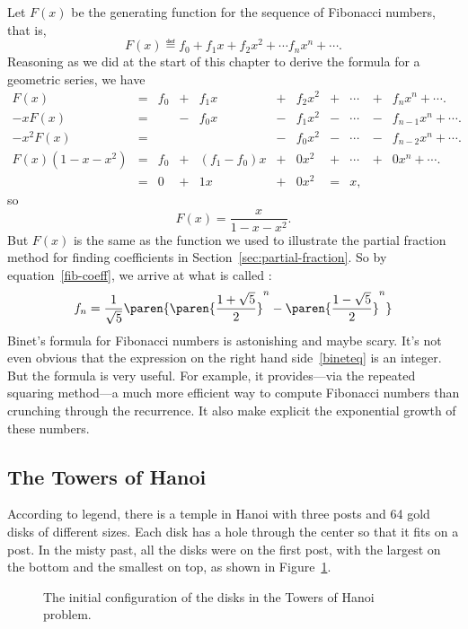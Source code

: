 Let $F(x)$ be the generating function for the sequence of
Fibonacci numbers, that is,
\[
F(x) \eqdef f_0 + f_1 x + f_2 x^2 + \cdots f_n x^n + \cdots.
\]
Reasoning as we did at the start of this chapter to derive the formula
for a geometric series, we have
\[
\begin{array}{rcrcrcrcrcrcr}
F(x)     & = & f_0 & + & f_1 x & + & f_2 x^2 & + & \cdots & + &    f_n x^n + \cdots.\\
-xF(x)   & = &     & - & f_0 x & - & f_1 x^2 & - & \cdots & - & f_{n-1} x^n + \cdots.\\
-x^2F(x) & = &     &   &       & - & f_0 x^2 & - & \cdots & - & f_{n-2} x^n + \cdots.\\
\hline
F(x)(1-x-x^2)
         & = & f_0 & + & (f_1-f_0) x
                               & + &   0 x^2 & + & \cdots & + & 0 x^n + \cdots.\\
         & = &  0  & + & 1   x & + &   0 x^2 & = & x,
\end{array}
\]
so
\[
F(x) = \frac{x}{1 - x - x^2}.
\]
But $F(x)$ is the same as the function we used to illustrate the
partial fraction method for finding coefficients in
Section~\ref{sec:partial-fraction}.  So by equation~\eqref{fib-coeff},
we arrive at what is called :
\begin{equation}\label{bineteq}
 f_n  = \frac{1}{\sqrt{5}}
      \paren{
      \paren{\frac{1 + \sqrt{5}}{2}}^n -
      \paren{\frac{1 - \sqrt{5}}{2}}^n}
\end{equation}
Binet's formula for Fibonacci numbers is astonishing and maybe scary.
It's not even obvious that the expression on the right hand
side~\eqref{bineteq} is an integer.  But the formula is very useful.
For example, it provides---via the repeated squaring method---a much
more efficient way to compute Fibonacci numbers than crunching through
the recurrence.  It also make explicit the exponential growth of these
numbers.

\subsection{The Towers of Hanoi}\label{hanoi-subsec}
According to legend, there is a temple in Hanoi with three posts and
64 gold disks of different sizes.  Each disk has a hole through the
center so that it fits on a post.  In the misty past, all the disks
were on the first post, with the largest on the bottom and the
smallest on top, as shown in Figure~\ref{fig:10A1}.

\begin{figure}


\caption{The initial configuration of the disks in the Towers of Hanoi
  problem.}

\label{fig:10A1}

\end{figure}

